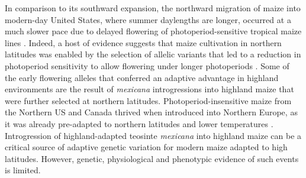 \documentclass[9pt,twocolumn,twoside,lineno]{BioRxiv}
\begin{document}
In comparison to its southward expansion, the northward migration of maize into modern-day United States, where summer daylengths are longer, occurred at a much slower pace \cite{Da_Fonseca2015-zh, Swarts2017-ge} due to delayed flowering of photoperiod-sensitive tropical maize lines \cite{Hung2012-ms}.
Indeed, a host of evidence suggests that maize cultivation in northern latitudes was enabled by the selection of allelic variants that led to a reduction in photoperiod sensitivity to allow flowering under longer photoperiods \cite{Liang2018-af, Guo2018-on, Coles2010-db, Huang2018-ga, Yang2013-lg, Salvi2007-ku, Hung2012-ms}.
Some of the early flowering alleles that conferred an adaptive advantage in highland environments are the result of \textit{mexicana} introgressions into highland maize \cite{Guo2018-on} that were further selected at northern latitudes.
Photoperiod-insensitive maize from the Northern US and Canada thrived when introduced into Northern Europe, as it was already pre-adapted to northern latitudes and lower temperatures \cite{Brandenburg2017-ii}.
Introgression of highland-adapted teosinte \textit{mexicana} into highland maize can be a critical source of adaptive genetic variation for modern maize adapted to high latitudes.
However, genetic, physiological and phenotypic evidence of such events is  limited.
\end{document}
